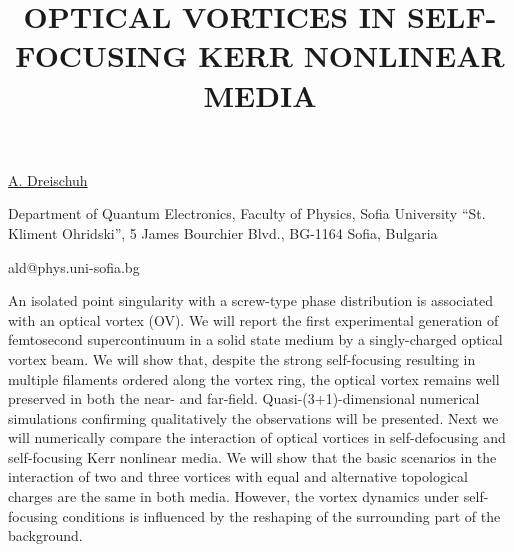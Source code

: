 \title{OPTICAL VORTICES IN SELF-FOCUSING KERR \mbox{NONLINEAR} MEDIA}

\underline{A. Dreischuh} 

{\normalsize{\vspace{-4mm}
Department of Quantum Electronics, Faculty of Physics, Sofia
University ``St. Kliment Ohridski'', 5 James Bourchier Blvd.,
BG-1164 Sofia, Bulgaria

\email ald@phys.uni-sofia.bg}}

An isolated point singularity with a screw-type phase distribution is associated with an optical vortex (OV). We will report the first experimental generation of femtosecond supercontinuum in a solid state medium by a singly-charged optical vortex beam. We will show that, despite the strong self-focusing resulting in multiple filaments ordered along the vortex ring, the optical vortex remains well preserved in both the near- and far-field. Quasi-(3+1)-dimensional numerical simulations confirming qualitatively the observations will be presented. Next we will numerically compare the interaction of optical vortices in self-defocusing and self-focusing Kerr nonlinear media. We will show that the basic scenarios in the interaction of two and three vortices with equal and alternative topological charges are the same in both media. However, the vortex dynamics under self-focusing conditions is influenced by the reshaping of the surrounding part of the background.

\vspace{\baselineskip}